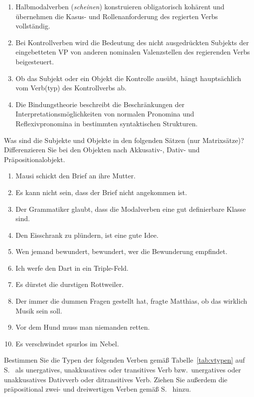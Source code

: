 \begin{sloppypar}
\begin{enumerate}
  \item Halbmodalverben (\textit{scheinen}) konstruieren obligatorisch kohärent und übernehmen die Kasus- und Rollenanforderung des regierten Verbs vollständig.
  \item Bei Kontrollverben wird die Bedeutung des nicht ausgedrückten Subjekts der eingebetteten VP von anderen nominalen Valenzstellen des regierenden Verbs beigesteuert.
  \item Ob das Subjekt oder ein Objekt die Kontrolle ausübt, hängt hauptsächlich vom Verb(typ) des Kontrollverbs ab.
  \item Die Bindungstheorie beschreibt die Beschränkungen der Interpretationsmöglichkeiten von normalen Pronomina und Reflexivpronomina in bestimmten syntaktischen Strukturen.
\end{enumerate}

\end{sloppypar}

\Uebungen

\Uebung \label{u131} Was sind die Subjekte und Objekte in den folgenden Sätzen (nur Matrixsätze)?
Differenzieren Sie bei den Objekten nach Akkusativ-, Dativ- und Präpositionalobjekt.

\begin{enumerate}\Lf
  \item Mausi schickt den Brief an ihre Mutter.
  \item Es kann nicht sein, dass der Brief nicht angekommen ist.
  \item Der Grammatiker glaubt, dass die Modalverben eine gut definierbare Klasse sind.
  \item Den Eisschrank zu plündern, ist eine gute Idee.
  \item Wen jemand bewundert, bewundert, wer die Bewunderung empfindet.
  \item Ich werfe den Dart in ein Triple-Feld.
  \item Es dürstet die durstigen Rottweiler.
  \item Der immer die dummen Fragen gestellt hat, fragte Matthias, ob das wirklich Musik sein soll.
  \item Vor dem Hund muss man niemanden retten.
  \item Es verschwindet spurlos im Nebel.
\end{enumerate}

\Uebung \label{u132} Bestimmen Sie die Typen der folgenden Verben gemäß Tabelle~\ref{tab:vtypen} auf S.~\pageref{tab:vtypen} als unergatives, unakkusatives oder transitives Verb bzw.\ unergatives oder unakkusatives Dativverb oder ditransitives Verb.
Ziehen Sie außerdem die präpositional zwei- und dreiwertigen Verben gemäß S.~\pageref{abs:praepditrans} hinzu.

